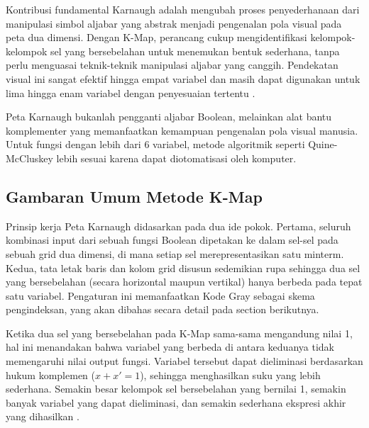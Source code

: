 Kontribusi fundamental Karnaugh adalah mengubah proses penyederhanaan dari manipulasi simbol aljabar yang abstrak menjadi pengenalan pola visual pada peta dua dimensi. Dengan K-Map, perancang cukup mengidentifikasi kelompok-kelompok sel yang bersebelahan untuk menemukan bentuk sederhana, tanpa perlu menguasai teknik-teknik manipulasi aljabar yang canggih. Pendekatan visual ini sangat efektif hingga empat variabel dan masih dapat digunakan untuk lima hingga enam variabel dengan penyesuaian tertentu \cite{wiki_karnaugh}.

\begin{konsep}
Peta Karnaugh bukanlah pengganti aljabar Boolean, melainkan alat bantu komplementer yang memanfaatkan kemampuan pengenalan pola visual manusia. Untuk fungsi dengan lebih dari 6 variabel, metode algoritmik seperti Quine-McCluskey lebih sesuai karena dapat diotomatisasi oleh komputer.
\end{konsep}

\subsection{Gambaran Umum Metode K-Map}

Prinsip kerja Peta Karnaugh didasarkan pada dua ide pokok. Pertama, seluruh kombinasi input dari sebuah fungsi Boolean dipetakan ke dalam sel-sel pada sebuah grid dua dimensi, di mana setiap sel merepresentasikan satu minterm. Kedua, tata letak baris dan kolom grid disusun sedemikian rupa sehingga dua sel yang bersebelahan (secara horizontal maupun vertikal) hanya berbeda pada tepat satu variabel. Pengaturan ini memanfaatkan Kode Gray sebagai skema pengindeksan, yang akan dibahas secara detail pada section berikutnya.

Ketika dua sel yang bersebelahan pada K-Map sama-sama mengandung nilai 1, hal ini menandakan bahwa variabel yang berbeda di antara keduanya tidak memengaruhi nilai output fungsi. Variabel tersebut dapat dieliminasi berdasarkan hukum komplemen ($x + x' = 1$), sehingga menghasilkan suku yang lebih sederhana. Semakin besar kelompok sel bersebelahan yang bernilai 1, semakin banyak variabel yang dapat dieliminasi, dan semakin sederhana ekspresi akhir yang dihasilkan \cite{rosen2019}.
